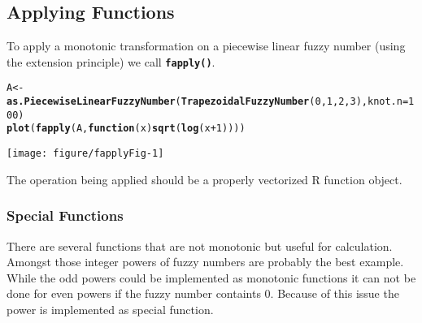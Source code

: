 \documentclass[11pt]{article}\usepackage[]{graphicx}\usepackage[]{color}
\makeatletter
\newcommand{\hlnum}[1]{\textcolor[rgb]{0.686,0.059,0.569}{#1}}%
\newcommand{\hlopt}[1]{\textcolor[rgb]{0,0,0}{#1}}%
\newcommand{\hlstd}[1]{\textcolor[rgb]{0.345,0.345,0.345}{#1}}%
\newcommand{\hlkwa}[1]{\textcolor[rgb]{0.161,0.373,0.58}{\textbf{#1}}}%
\newcommand{\hlkwb}[1]{\textcolor[rgb]{0.69,0.353,0.396}{#1}}%
\newcommand{\hlkwc}[1]{\textcolor[rgb]{0.333,0.667,0.333}{#1}}%
\newcommand{\hlkwd}[1]{\textcolor[rgb]{0.737,0.353,0.396}{\textbf{#1}}}%
\newenvironment{kframe}{%
 \def\at@end@of@kframe{}%
 \ifinner\ifhmode%
  \def\at@end@of@kframe{\end{minipage}}%
  \begin{minipage}{\columnwidth}%
 \fi\fi%
 \def\FrameCommand##1{\hskip\@totalleftmargin \hskip-\fboxsep
 \colorbox{shadecolor}{##1}\hskip-\fboxsep
     \hskip-\linewidth \hskip-\@totalleftmargin \hskip\columnwidth}%
 \MakeFramed {\advance\hsize-\width
   \@totalleftmargin\z@ \linewidth\hsize
   \@setminipage}}%
 {\par\unskip\endMakeFramed%
 \at@end@of@kframe}
\newenvironment{knitrout}{}{} %
\newcommand{\lang}[1]{\textsf{#1}\xspace}
\newcommand{\R}{\lang{R}}
\newcommand{\func}[1]{\texttt{\hlkwd{#1}}}
\makeatother
\begin{document}
\subsection{Applying Functions}


To apply a monotonic transformation on a piecewise linear fuzzy number
(using the extension principle) we call \func{fapply()}.

\begin{knitrout}\small
{}\color{fgcolor}\begin{kframe}
\begin{alltt}
\hlstd{A} \hlkwb{<-} \hlkwd{as.PiecewiseLinearFuzzyNumber}\hlstd{(}\hlkwd{TrapezoidalFuzzyNumber}\hlstd{(}\hlnum{0}\hlstd{,}\hlnum{1}\hlstd{,}\hlnum{2}\hlstd{,}\hlnum{3}\hlstd{),} \hlkwc{knot.n}\hlstd{=}\hlnum{100}\hlstd{)}
\hlkwd{plot}\hlstd{(}\hlkwd{fapply}\hlstd{(A,} \hlkwa{function}\hlstd{(}\hlkwc{x}\hlstd{)} \hlkwd{sqrt}\hlstd{(}\hlkwd{log}\hlstd{(x}\hlopt{+}\hlnum{1}\hlstd{))))}
\end{alltt}
\end{kframe}
\end{knitrout}

\begin{center}
\begin{knitrout}\small
{}\color{fgcolor}

{\centering \texttt{[image: figure/fapplyFig-1]} 

}



\end{knitrout}
\end{center}

\noindent
The operation being applied should be a properly
vectorized \R function object.

\subsubsection{Special Functions}

There are several functions that are not monotonic but useful for
calculation. Amongst those integer powers of fuzzy numbers are
probably the best example. While the odd powers could be implemented
as monotonic functions it can not be done for even powers if the
fuzzy number containts 0. Because of this issue the power is
implemented as special function.
\end{document}
